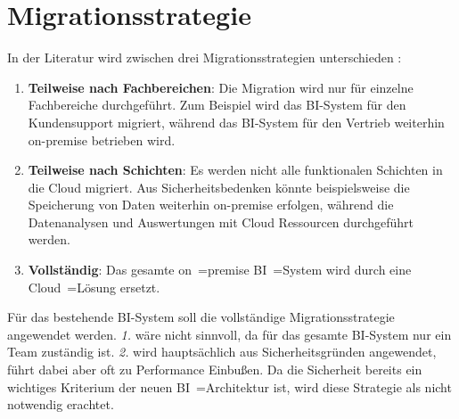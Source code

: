\section{Migrationsstrategie} \label{sec:beschreibungMigrationsstrategie}
In der Literatur wird zwischen drei Migrationsstrategien unterschieden \cite{juan-verdejo_moving_2014}:
\begin{enumerate}
\item \textbf{Teilweise nach Fachbereichen}: Die Migration wird nur für einzelne Fachbereiche durchgeführt. Zum Beispiel wird das BI-System für den Kundensupport migriert, während das BI-System für den Vertrieb weiterhin on-premise betrieben wird.
\item \textbf{Teilweise nach Schichten}: Es werden nicht alle funktionalen Schichten in die Cloud migriert. Aus Sicherheitsbedenken könnte beispielsweise die Speicherung von Daten weiterhin on-premise erfolgen, während die Datenanalysen und Auswertungen mit Cloud Ressourcen durchgeführt werden.
\item \textbf{Vollständig}: Das gesamte on~=premise BI~=System wird durch eine Cloud~=Lösung ersetzt.
\end{enumerate}
Für das bestehende BI-System soll die vollständige Migrationsstrategie angewendet werden. \textit{1.} wäre nicht sinnvoll, da für das gesamte BI-System nur ein Team zuständig ist. \textit{2.} wird hauptsächlich aus Sicherheitsgründen angewendet, führt dabei aber oft zu Performance Einbußen. Da die Sicherheit bereits ein wichtiges Kriterium der neuen BI~=Architektur ist, wird diese Strategie als nicht notwendig erachtet.